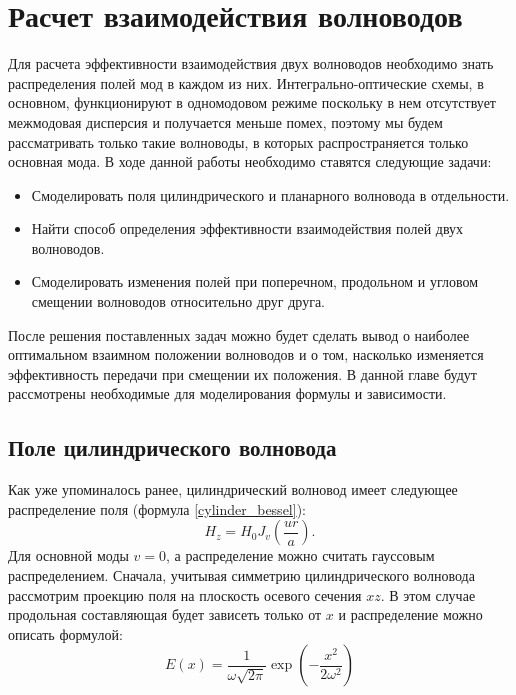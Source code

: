 \chapter{Расчет взаимодействия волноводов}
\label{coupling}

Для расчета эффективности взаимодействия двух волноводов необходимо знать распределения полей мод в каждом из них. Интегрально-оптические схемы, в основном, функционируют в одномодовом режиме поскольку в нем отсутствует межмодовая дисперсия и получается меньше помех, поэтому мы будем рассматривать только такие волноводы, в которых распространяется только основная мода. В ходе данной работы необходимо ставятся следующие задачи:
\begin{itemize}
	\item Смоделировать поля цилиндрического и планарного волновода в отдельности.
	\item Найти способ определения эффективности взаимодействия полей двух волноводов.
	\item Смоделировать изменения полей при поперечном, продольном и угловом смещении волноводов относительно друг друга.
\end{itemize} 
После решения поставленных задач можно будет сделать вывод о наиболее оптимальном взаимном положении волноводов и о том, насколько изменяется эффективность передачи при смещении их положения. В данной главе будут рассмотрены необходимые для моделирования формулы и зависимости.

\section{Поле цилиндрического волновода}
\label{cylinder_field}
Как уже упоминалось ранее, цилиндрический волновод имеет следующее распределение поля (формула \ref{cylinder_bessel}):
$$
	H_z = H_0 J_v (\frac{ur}{a}).
$$
Для основной моды $v = 0$, а распределение можно считать гауссовым распределением. Сначала, учитывая  симметрию цилиндрического волновода рассмотрим проекцию поля на плоскость осевого сечения $xz$. В этом случае продольная составляющая будет зависеть только от $x$ и распределение можно описать формулой:
\begin{equation}
  \label{gauss}
  E(x)=\frac{1}{\omega\sqrt{2\pi}}\exp\left(-\frac{x^2}{2\omega^2}\right)
\end{equation}

